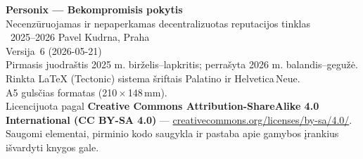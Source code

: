 \thispagestyle{empty}
\ifdefined\printmode\vspace*{\fill}\else{}\fi
\begin{flushleft}\small\sffamily
\textbf{Personix --- Bekompromisis pokytis}\\[0.3em]
Necenzūruojamas ir nepaperkamas decentralizuotas reputacijos tinklas\\[1.4em]

\textcopyright\ 2025--2026 Pavel Kudrna, Praha\\[0.4em]

Versija~6 (2026-05-21)\\
Pirmasis juodraštis 2025 m. birželis--lapkritis; perrašyta 2026 m. balandis--gegužė.\\[1.4em]

Rinkta \LaTeX{} (Tectonic) sistema šriftais Palatino ir Helvetica\,Neue.\\
A5 gulsčias formatas (210\,$\times$\,148\,mm).\\[1.4em]

Licencijuota pagal \textbf{Creative Commons Attribution-ShareAlike 4.0
International (CC BY-SA 4.0)} ---
\href{https://creativecommons.org/licenses/by-sa/4.0/}{creativecommons.org/licenses/by-sa/4.0/}.
Saugomi elementai, pirminio kodo saugykla ir pastaba apie gamybos įrankius
išvardyti knygos gale.
\end{flushleft}
\ifdefined\printmode\else{}\fi
\clearpage
